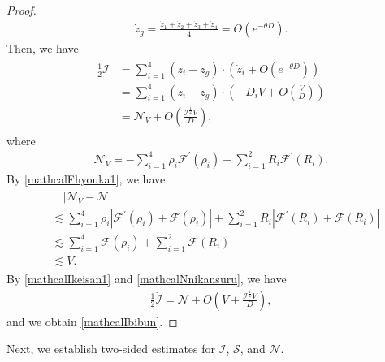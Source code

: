 \documentclass[reqno]{amsart}
\theoremstyle{plain}
\theoremstyle{definition}
\numberwithin{equation}{section}
\begin{document}
\begin{proof}
\begin{align*}
\dot{z}_g
=\frac{\dot{z}_1+\dot{z}_2+\dot{z}_3+\dot{z}_4}{4}
=O\left(e^{-\theta D}\right).
\end{align*}
Then, we have
\begin{align}\label{mathcalIkeisan1}
\begin{aligned}
\frac{1}{2}\dot{\mathcal{I}}&=\sum_{i=1}^4\left(z_i-z_g\right)\cdot \left(\dot{z}_i+O\left(e^{-\theta D}\right)\right)
\\
&=\sum_{i=1}^4\left(z_i-z_g\right)\cdot\left(-D_iV+O\left(\frac{V}{D}\right)\right)
\\
&=\mathcal{N}_V+O\left(\frac{\mathcal{I}^{\frac{1}{2}}V}{D}\right),
\end{aligned}
\end{align}
where
\begin{align}\label{mathcalNVdef}
\mathcal{N}_V=-\sum_{i=1}^4\rho_i\mathcal{F}^{\prime}(\rho_i)+\sum_{i=1}^2R_i\mathcal{F}^{\prime}(R_i).
\end{align}
By \eqref{mathcalFhyouka1}, we have
\begin{align}\label{mathcalNnikansuru}
\begin{aligned}
&\quad \left|\mathcal{N}_V-\mathcal{N}\right|
\\
&\lesssim \sum_{i=1}^4\rho_i\left|\mathcal{F}^{\prime}(\rho_i)+\mathcal{F}(\rho_i)\right|+\sum_{i=1}^2R_i\left|\mathcal{F}^{\prime}(R_i)+\mathcal{F}(R_i)\right|
\\
&\lesssim \sum_{i=1}^4\mathcal{F}(\rho_i)+\sum_{i=1}^2\mathcal{F}(R_i)
\\
&\lesssim V.
\end{aligned}
\end{align}
By \eqref{mathcalIkeisan1} and \eqref{mathcalNnikansuru}, we have
\begin{align*}
\frac{1}{2}\dot{\mathcal{I}}=\mathcal{N}+O\left(V+\frac{\mathcal{I}^{\frac{1}{2}}V}{D}\right),
\end{align*}
and we obtain \eqref{mathcalIbibun}.
\end{proof}

Next, we establish two-sided estimates for $\mathcal{I}$, $\mathcal{S}$, and $\mathcal{N}$.
\end{document}

